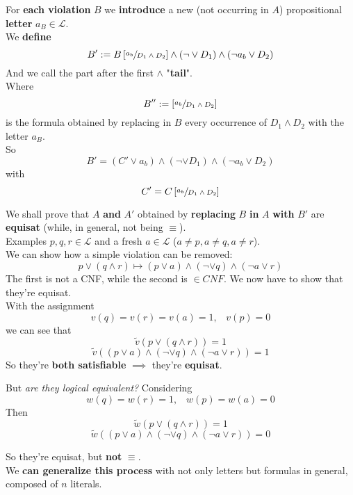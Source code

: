 	\newpage

	For \textbf{each violation} $B$ we \textbf{introduce} a new (not occurring in $A$) propositional \textbf{letter} $a_B \in \mathcal{L}$.\\

	We \textbf{define }
	$$ B' := B \left[\sfrac{a_b}{D_1 \wedge D_2}\right] \wedge (\neg \vee D_1) \wedge (\neg a_b \vee D_2) $$
	And we call the part after the first $\wedge$ "\textbf{tail}".\\
	Where
	$$ B'' := \left[\sfrac{a_b}{D_1 \wedge D_2}\right] $$
	is the formula obtained by replacing in $B$ every occurrence of $D_1 \wedge D_2$ with the letter $a_B$.\\

	So
	$$B' = (C' \vee a_b) \wedge (\neg \vee D_1) \wedge (\neg a_b \vee D_2) $$
	with
	$$ C' = C \left[\sfrac{a_b}{D_1 \wedge D_2}\right] $$

	We shall prove that $A$ \textbf{and} $A'$ obtained by \textbf{replacing} $B$ \textbf{in} $A$ \textbf{with} $B'$ are \textbf{equisat} (while, in general, not being $\equiv$).\\

	Examples $p,q,r \in \mathcal{L}$ and a fresh $a \in \mathcal{L}$ ($a \neq p, a \neq q, a \neq r$).\\
	We can show how a simple violation can be removed:
	$$ p \vee (q \wedge r) \mapsto (p \vee a) \wedge (\neg \vee q) \wedge (\neg a \vee r) $$
	The first is not a CNF, while the second is $\in CNF$. We now have to show that they're equisat.\\

	With the assignment
	$$ v(q) = v(r) = v(a) = 1, \;\;\; v(p) = 0$$
	we can see that
	$$ \tilde v (p \vee (q \wedge r)) = 1 $$
	$$ \tilde v ((p \vee a) \wedge (\neg \vee q) \wedge (\neg a \vee r)) = 1$$
	So they're \textbf{both satisfiable} $\implies$ they're \textbf{equisat}.

	\newpage

	But \textit{are they logical equivalent?} Considering
	$$ w(q) = w(r) = 1, \;\;\; w(p) = w(a) = 0$$
	Then
	$$ \tilde w (p \vee (q \wedge r)) = 1 $$
	$$ \tilde w ((p \vee a) \wedge (\neg \vee q) \wedge (\neg a \vee r)) = 0$$

	So they're equisat, but \textbf{not} $\equiv$.\\

	We \textbf{can generalize this process} with not only letters but formulas in general, composed of $n$ literals.\\

